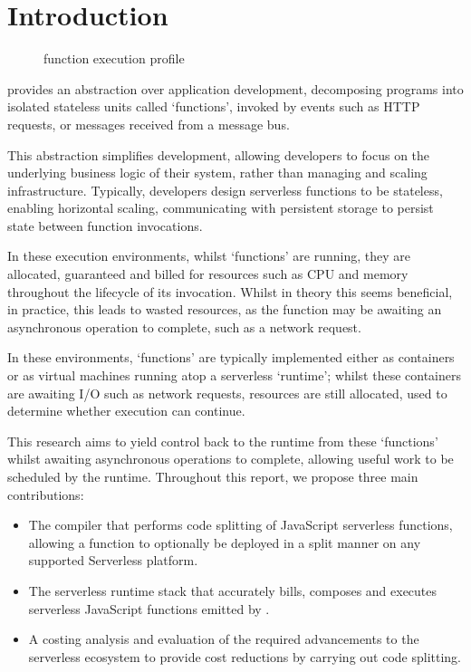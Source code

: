 \chapter{Introduction}

\begin{figure}
    \begin{center}
        
    \end{center}
    \caption{\faas{} function execution profile}
\end{figure}

\faasxlong{} provides an abstraction over application development, decomposing programs into isolated stateless units called `functions', invoked by events such as HTTP requests, or messages received from a message bus\cite{ibmWhatFaaSFunctionasaService2024}.

This abstraction simplifies development, allowing developers to focus on the underlying business logic of their system, rather than managing and scaling infrastructure. Typically, developers design serverless functions to be stateless\cite{ggailey777AzureFunctionsBest2022}, enabling horizontal scaling\cite{ngoEvaluatingScalabilityElasticity2022}, communicating with persistent storage to persist state between function invocations.

In these execution environments, whilst `functions' are running, they are allocated, guaranteed and billed for resources such as CPU and memory throughout the lifecycle of its invocation. Whilst in theory this seems beneficial, in practice, this leads to wasted resources, as the function may be awaiting an asynchronous operation to complete, such as a network request.

In these environments, `functions' are typically implemented either as containers or as virtual machines running atop a serverless `runtime'; whilst these containers are awaiting I/O such as network requests, resources are still allocated, used to determine whether execution can continue.

This research aims to yield control back to the runtime from these `functions' whilst awaiting asynchronous operations to complete, allowing useful work to be scheduled by the runtime. Throughout this report, we propose three main contributions:

\begin{itemize}
    \item The \faaasc{} compiler that performs code splitting of JavaScript serverless functions, allowing a function to optionally be deployed in a split manner on any supported Serverless\cite{serverlessServerlessZeroFrictionServerless2024} platform.

    \item The \faaastime{} serverless runtime stack that accurately bills, composes and executes serverless JavaScript functions emitted by \faaasc{}.

    \item A costing analysis and evaluation of the required advancements to the serverless ecosystem to provide cost reductions by carrying out code splitting.
\end{itemize}

